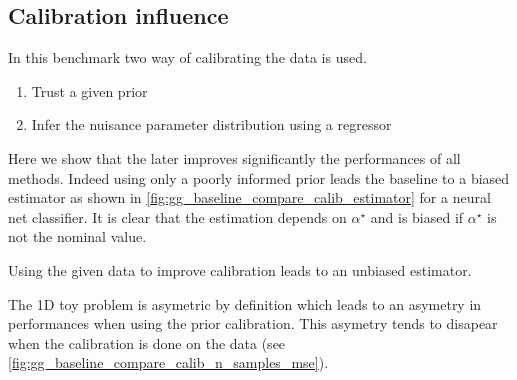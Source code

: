 






\subsection{Calibration influence} %
\label{sub:calibration_influence}



In this benchmark two way of calibrating the data is used.
\begin{enumerate}
  \item Trust a given prior
  \item Infer the nuisance parameter distribution using a regressor
\end{enumerate}

Here we show that the later improves significantly the performances of all methods.
Indeed using only a poorly informed prior leads the baseline to a biased estimator as shown in \autoref{fig:gg_baseline_compare_calib_estimator} for a neural net classifier.
It is clear that the estimation depends on $\alpha^\star$ and is biased if $\alpha^\star$ is not the nominal value.

Using the given data to improve calibration leads to an unbiased estimator.




The 1D toy problem is asymetric by definition which leads to an asymetry in performances when using the prior calibration.
This asymetry tends to disapear when the calibration is done on the data (see \autoref{fig:gg_baseline_compare_calib_n_samples_mse}).


